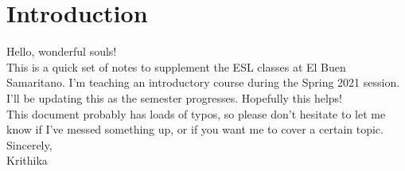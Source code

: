 \chapter{Introduction}

Hello, wonderful souls! \\

This is a quick set of notes to supplement
the ESL classes at El Buen Samaritano.
I'm teaching an introductory course during the
Spring 2021 session.
I'll be updating this as the semester progresses.
Hopefully this helps! \\

This document probably has loads of typos,
so please don't hesitate to let me know if I've
messed something up, or if you want me to
cover a certain topic.\\

Sincerely,\\
Krithika
